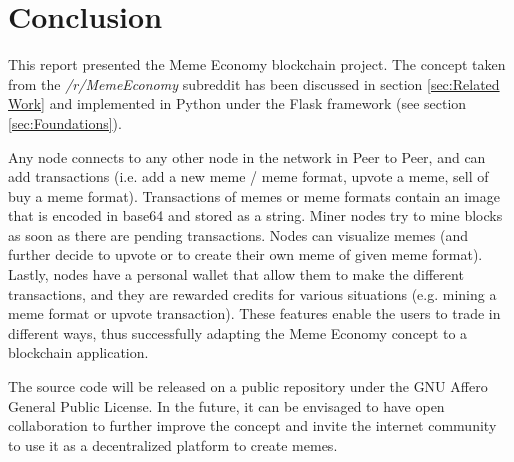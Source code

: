 \documentclass[12pt]{article}
\begin{document}
\section{Conclusion} \label{sec:Conclusion} %
This report presented the Meme Economy blockchain project. The concept taken from the \textit{/r/MemeEconomy} subreddit has been discussed in section \ref{sec:Related Work} and implemented in Python under the Flask framework (see section \ref{sec:Foundations}). 

Any node connects to any other node in the network in Peer to Peer, and can add transactions (i.e. add a new meme / meme format, upvote a meme, sell of buy a meme format). Transactions of memes or meme formats contain an image that is encoded in base64 and stored as a string. Miner nodes try to mine blocks as soon as there are pending transactions. Nodes can visualize memes (and further decide to upvote or to create their own meme of given meme format). Lastly, nodes have a personal wallet that allow them to make the different transactions, and they are rewarded credits for various situations (e.g. mining a meme format or upvote transaction). These features enable the users to trade in different ways, thus successfully adapting the Meme Economy concept to a blockchain application.

The source code will be released on a public repository under the GNU Affero General Public License. In the future, it can be envisaged to have open collaboration to further improve the concept and invite the internet community to use it as a decentralized platform to create memes.
\end{document}
